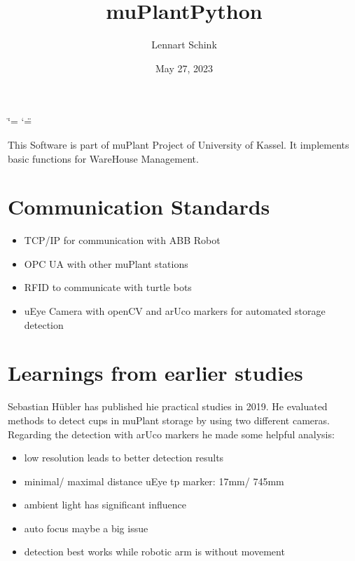 \documentclass[letterpaper,10pt,english]{sphinxmanual}
\title{muPlantPython}
\date{May 27, 2023}
\author{Lennart Schink}
\begin{document}
\ifdefined\shorthandoff
  \ifnum\catcode`\=\string=\active\shorthandoff{=}\fi
  \ifnum\catcode`\"=\active{}\fi
\fi

\pagestyle{empty}
\sphinxmaketitle
\pagestyle{plain}
\sphinxtableofcontents
\pagestyle{normal}
\label{\detokenize{index::doc}}


\sphinxAtStartPar
This Software is part of muPlant Project of University of Kassel.
It implements basic functions for WareHouse Management.


\chapter{Communication Standards}
\label{\detokenize{index:communication-standards}}\begin{itemize}
\item {} 
\sphinxAtStartPar
TCP/IP for communication with ABB Robot

\item {} 
\sphinxAtStartPar
OPC UA with other muPlant stations

\item {} 
\sphinxAtStartPar
RFID to communicate with turtle bots

\item {} 
\sphinxAtStartPar
uEye Camera with openCV and arUco markers for automated storage detection

\end{itemize}


\chapter{Learnings from earlier studies}
\label{\detokenize{index:learnings-from-earlier-studies}}
\sphinxAtStartPar
Sebastian Hübler has published hie practical studies in 2019. He evaluated methods to detect cups
in muPlant storage by using two different cameras.
Regarding the detection with arUco markers he made some helpful analysis:
\begin{itemize}
\item {} 
\sphinxAtStartPar
low resolution leads to better detection results

\item {} 
\sphinxAtStartPar
minimal/ maximal distance uEye tp marker: 17mm/ 745mm

\item {} 
\sphinxAtStartPar
ambient light has significant influence

\item {} 
\sphinxAtStartPar
auto focus maybe a big issue

\item {} 
\sphinxAtStartPar
detection best works while robotic arm is without movement

\end{itemize}
\end{document}
